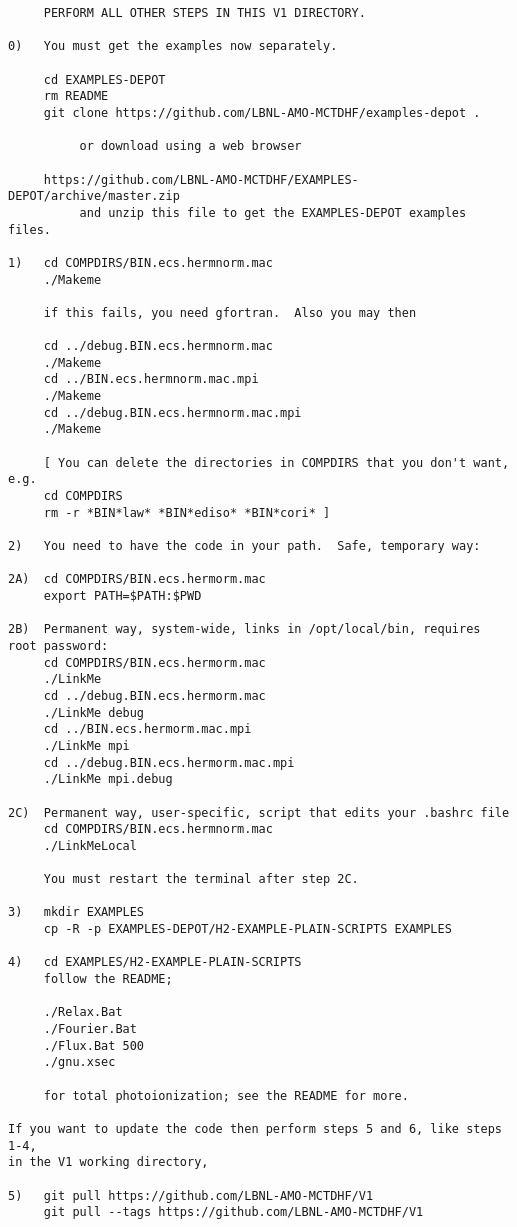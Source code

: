 \begin{verbatim}
     PERFORM ALL OTHER STEPS IN THIS V1 DIRECTORY.

0)   You must get the examples now separately.

     cd EXAMPLES-DEPOT
     rm README
     git clone https://github.com/LBNL-AMO-MCTDHF/examples-depot .

          or download using a web browser

     https://github.com/LBNL-AMO-MCTDHF/EXAMPLES-DEPOT/archive/master.zip
          and unzip this file to get the EXAMPLES-DEPOT examples files.

1)   cd COMPDIRS/BIN.ecs.hermnorm.mac
     ./Makeme

     if this fails, you need gfortran.  Also you may then

     cd ../debug.BIN.ecs.hermnorm.mac
     ./Makeme
     cd ../BIN.ecs.hermnorm.mac.mpi
     ./Makeme
     cd ../debug.BIN.ecs.hermnorm.mac.mpi
     ./Makeme

     [ You can delete the directories in COMPDIRS that you don't want, e.g.
     cd COMPDIRS
     rm -r *BIN*law* *BIN*ediso* *BIN*cori* ]

2)   You need to have the code in your path.  Safe, temporary way:

2A)  cd COMPDIRS/BIN.ecs.hermorm.mac
     export PATH=$PATH:$PWD

2B)  Permanent way, system-wide, links in /opt/local/bin, requires root password:
     cd COMPDIRS/BIN.ecs.hermorm.mac
     ./LinkMe
     cd ../debug.BIN.ecs.hermorm.mac
     ./LinkMe debug
     cd ../BIN.ecs.hermorm.mac.mpi
     ./LinkMe mpi
     cd ../debug.BIN.ecs.hermorm.mac.mpi
     ./LinkMe mpi.debug

2C)  Permanent way, user-specific, script that edits your .bashrc file
     cd COMPDIRS/BIN.ecs.hermnorm.mac
     ./LinkMeLocal

     You must restart the terminal after step 2C.

3)   mkdir EXAMPLES
     cp -R -p EXAMPLES-DEPOT/H2-EXAMPLE-PLAIN-SCRIPTS EXAMPLES

4)   cd EXAMPLES/H2-EXAMPLE-PLAIN-SCRIPTS
     follow the README; 

     ./Relax.Bat
     ./Fourier.Bat 
     ./Flux.Bat 500
     ./gnu.xsec

     for total photoionization; see the README for more.
 
If you want to update the code then perform steps 5 and 6, like steps 1-4, 
in the V1 working directory,

5)   git pull https://github.com/LBNL-AMO-MCTDHF/V1
     git pull --tags https://github.com/LBNL-AMO-MCTDHF/V1


\end{verbatim}
